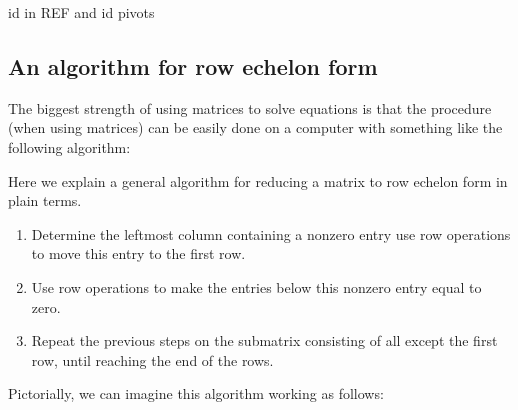 \documentclass{ximera}
\begin{document}
\begin{question}
  id in REF and id pivots
\end{question}



\subsection{An algorithm for row echelon form}

The biggest strength of using matrices to solve equations is that the
procedure (when using matrices) can be easily done on a computer with
something like the following algorithm:

\begin{algorithm}
  Here we explain a general algorithm for reducing a matrix to row
  echelon form in plain terms.
  \begin{enumerate}
  \item Determine the leftmost column containing a nonzero entry use
    row operations to move this entry to the first row.
  \item Use row operations to make the entries below this nonzero entry equal to zero.
  \item Repeat the previous steps on the submatrix consisting of all
    except the first row, until reaching the end of the rows.
  \end{enumerate}
\end{algorithm}

Pictorially, we can imagine this algorithm working as follows:
\end{document}
